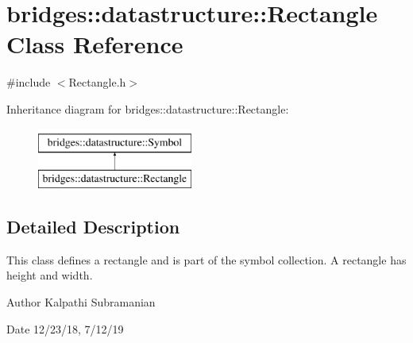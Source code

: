 \hypertarget{classbridges_1_1datastructure_1_1_rectangle}{}\section{bridges\+::datastructure\+::Rectangle Class Reference}
\label{classbridges_1_1datastructure_1_1_rectangle}


{\ttfamily \#include $<$Rectangle.\+h$>$}

Inheritance diagram for bridges\+::datastructure\+::Rectangle\+:\begin{figure}[H]
\begin{center}
\leavevmode
\includegraphics[height=2.000000cm]{classbridges_1_1datastructure_1_1_rectangle}
\end{center}
\end{figure}


\subsection{Detailed Description}
This class defines a rectangle and is part of the symbol collection. A rectangle has height and width. 

\begin{DoxyAuthor}{Author}
Kalpathi Subramanian 
\end{DoxyAuthor}
\begin{DoxyDate}{Date}
12/23/18, 7/12/19 
\end{DoxyDate}
